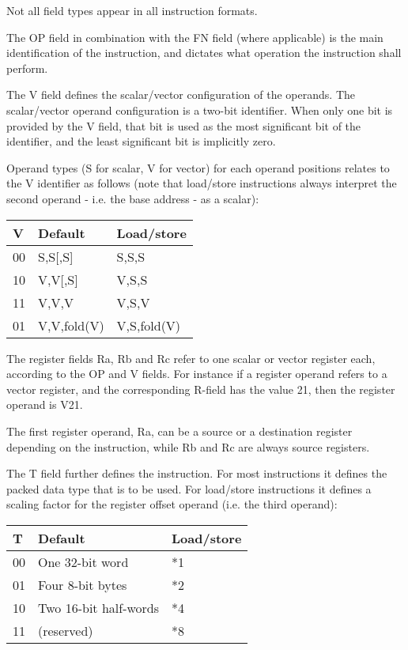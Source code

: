 Not all field types appear in all instruction formats.

The OP field in combination with the FN field (where applicable) is the main
identification of the instruction, and dictates what operation the instruction
shall perform.

The V field defines the scalar/vector configuration of the operands. The
scalar/vector operand configuration is a two-bit identifier. When only one bit
is provided by the V field, that bit is used as the most significant bit of the
identifier, and the least significant bit is implicitly zero.

Operand types (S for scalar, V for vector) for each operand positions relates
to the V identifier as follows (note that load/store instructions always
interpret the second operand - i.e. the base address - as a scalar):

\begin{tabular}{|l|l|l|}
  \hline
  \textbf{V} & \textbf{Default} & \textbf{Load/store} \\
  \hline
  00 & S,S[,S] & S,S,S \\
  \hline
  10 & V,V[,S] & V,S,S \\
  \hline
  11 & V,V,V & V,S,V \\
  \hline
  01 & V,V,fold(V) & V,S,fold(V) \\
  \hline
\end{tabular}

The register fields Ra, Rb and Rc refer to one scalar or vector register each,
according to the OP and V fields. For instance if a register operand refers to
a vector register, and the corresponding R-field has the value 21, then the
register operand is V21.

The first register operand, Ra, can be a source or a destination register
depending on the instruction, while Rb and Rc are always source registers.

The T field further defines the instruction. For most instructions it defines
the packed data type that is to be used. For load/store instructions it
defines a scaling factor for the register offset operand (i.e. the third
operand):

\begin{tabular}{|l|l|l|}
  \hline
  \textbf{T} & \textbf{Default} & \textbf{Load/store} \\
  \hline
  00 & One 32-bit word & *1 \\
  \hline
  01 & Four 8-bit bytes & *2 \\
  \hline
  10 & Two 16-bit half-words & *4 \\
  \hline
  11 & (reserved) & *8 \\
  \hline
\end{tabular}

